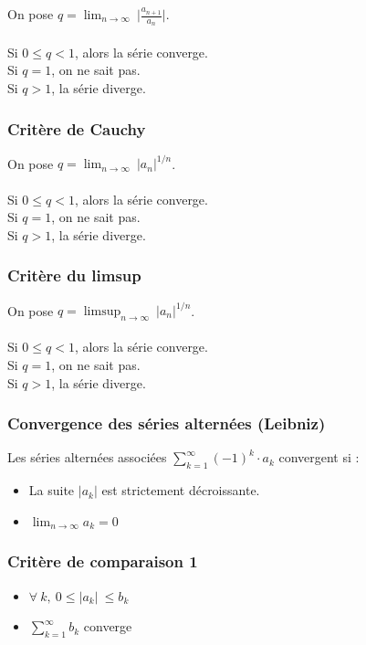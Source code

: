 \documentclass{article}
\begin{document}
On pose $ q = \lim_{n\to\infty}\ \lvert \frac{a_{n+1}}{a_n} \lvert $.\\\\
Si $ 0 \leq q < 1 $, alors la série converge.\\
Si $ q = 1 $, on ne sait pas.\\
Si $ q > 1 $, la série diverge.

\subsubsection{Critère de Cauchy}

On pose $ q = \lim_{n\to\infty}\ {\lvert a_{n}\lvert}^{1/n} $.\\\\
Si $ 0 \leq q < 1 $, alors la série converge.\\
Si $ q = 1 $, on ne sait pas.\\
Si $ q > 1 $, la série diverge.

\subsubsection{Critère du limsup}

On pose $ q = \limsup_{n\to\infty}\ {\lvert a_{n}\lvert}^{1/n} $.\\\\
Si $ 0 \leq q < 1 $, alors la série converge.\\
Si $ q = 1 $, on ne sait pas.\\
Si $ q > 1 $, la série diverge.

\subsubsection{Convergence des séries alternées (Leibniz)}

Les séries alternées associées $ \sum_{k=1}^{\infty} (-1)^k \cdot a_k $ convergent si :
\begin{itemize}
    \item La suite $ |a_k| $ est strictement décroissante.
    \item $ \lim_{n\to\infty} a_k = 0 $
\end{itemize}

\subsubsection{Critère de comparaison 1}

\begin{itemize}
    \item $ \forall\ k,\ 0 \leq \lvert a_k \lvert\ \leq b_k $
    \item $ \sum_{k=1}^{\infty} b_k $ converge
\end{itemize}
\end{document}
